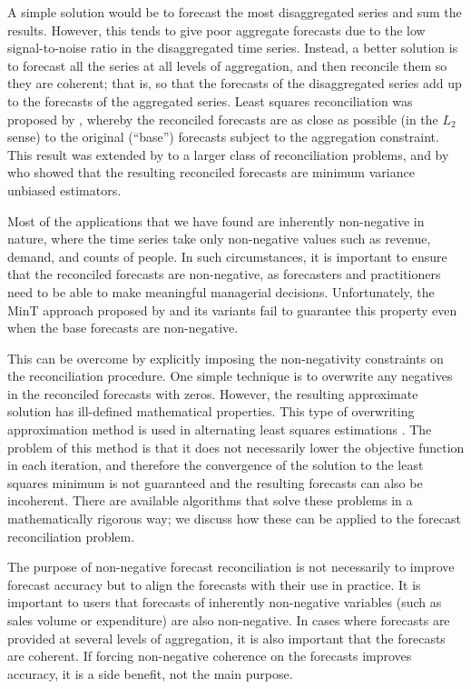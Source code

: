\documentclass[twocolumn]{svjour3}
\begin{document}
A simple solution would be to forecast the most disaggregated series and sum the results. However, this tends to give poor aggregate forecasts due to the low signal-to-noise ratio in the disaggregated time series. Instead, a better solution is to forecast all the series at all levels of aggregation, and then reconcile them so they are coherent; that is, so that the forecasts of the disaggregated series add up to the forecasts of the aggregated series. Least squares reconciliation was proposed by \citet{Hyndman2011}, whereby the reconciled forecasts are as close as possible (in the $L_2$ sense) to the original (``base'') forecasts subject to the aggregation constraint. This result was extended by \citet{Hyndman2016} to a larger class of reconciliation problems, and by \citet{Wick2018} who showed that the resulting reconciled forecasts are minimum variance unbiased estimators.

Most of the applications that we have found are inherently non-negative in nature, where the time series take only non-negative values such as revenue, demand, and counts of people. In such circumstances, it is important to ensure that the reconciled forecasts are non-negative, as forecasters and practitioners need to be able to make meaningful managerial decisions. Unfortunately, the MinT approach proposed by \citet{Wick2018} and its variants fail to guarantee this property even when the base forecasts are non-negative.

This can be overcome by explicitly imposing the non-negativity constraints on the reconciliation procedure. One simple technique is to overwrite any negatives in the reconciled forecasts with zeros. However, the resulting approximate solution has ill-defined mathematical properties. This type of overwriting approximation method is used in alternating least squares estimations \citep{Berry2007, Karjalainen1991}. The problem of this method is that it does not necessarily lower the objective function in each iteration, and therefore the convergence of the solution to the least squares minimum is not guaranteed and {\color{red} the resulting forecasts can also be incoherent.} There are available algorithms that solve these problems in a mathematically rigorous way; we discuss how these can be applied to the forecast reconciliation problem.

The purpose of non-negative forecast reconciliation is not necessarily to improve forecast accuracy but to align the forecasts with their use in practice. It is important to users that forecasts of inherently non-negative variables (such as sales volume or expenditure) are also non-negative. In cases where forecasts are provided at several levels of aggregation, it is also important that the forecasts are coherent. If forcing non-negative coherence on the forecasts improves accuracy, it is a side benefit, not the main purpose. 
\end{document}
